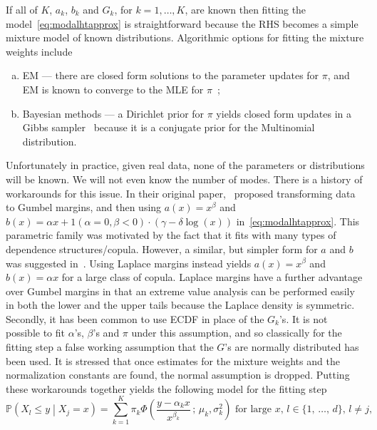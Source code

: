 \documentclass[11pt,twoside,openany]{book}
\newcommand{\prob}{\mathbb{P}}
\numberwithin{Theorem}{chapter}
\numberwithin{Definition}{chapter}
\numberwithin{Lemma}{chapter}
\numberwithin{Algorithm}{chapter}
\numberwithin{equation}{chapter}
\begin{document}
If all of $K$, $a_k$, $b_k$ and $G_k$, for $k=1,\ldots,K$, are known
then
fitting the model~\eqref{eq:modalhtapprox} is straightforward because
the RHS becomes a simple mixture model of known distributions.
Algorithmic options for fitting the mixture weights include
\begin{enumerate}[(a)]
  \item EM --- there are
    closed form solutions to the parameter updates for $\pi$, and EM is known
    to converge
    to the MLE for $\pi$~\citep{redner1984mixture};
  \item Bayesian methods --- a Dirichlet prior for $\pi$ yields
    closed form updates in a Gibbs sampler~\citep{li2019tutorial} because
    it is a conjugate prior for the Multinomial distribution.
\end{enumerate}
Unfortunately in practice, given real data, none of the parameters or
distributions will be
known. We will not even know the number of modes. There is a history of workarounds for this issue.
In their original paper,~\cite{heffernan2004conditional}
proposed transforming data to Gumbel margins, and then using $a(x) = x^\beta$
and $b(x) = \alpha x + 1(\alpha=0,\beta < 0)\cdot(\gamma - \delta \log (x))$
in~\eqref{eq:modalhtapprox}. This parametric family was motivated by
the fact that it fits with many types of dependence structures/copula.
However, a similar, but simpler form for $a$ and $b$
was suggested in~\cite{keef2013estimation}.
Using Laplace margins instead yields $a(x) = x^\beta$ and $b(x) = \alpha x$
for a large class of copula.
Laplace margins have a further advantage over Gumbel margins in that
an extreme value analysis can be performed easily in both the lower and the upper tails
because the Laplace density is symmetric.
Secondly, it has been common to use ECDF in place of the $G_k$'s.
It is not possible to fit $\alpha$'s, $\beta$'s and $\pi$ under this
assumption, and so classically for the fitting step a false working assumption
that the $G$'s are normally distributed has been used. It is stressed that once
estimates for the mixture weights and the normalization constants are found,
the normal assumption is dropped. Putting these workarounds together yields the
following model for the fitting step
\begin{equation}\label{eq:ht_mix_fitting_step}
  \prob\left(X_{l}\leq y\middle| X_{j} = x\right) = \sum_{k=1}^K \pi_k \Phi\left(\frac{y - \alpha_k x}{x^{\beta_k}}\,;\,\mu_k,\sigma_k^2\right) \text{ for large } x,\, l\in\{1,\,\ldots,\,d\},\,l\neq j,
\end{equation}
\end{document}

